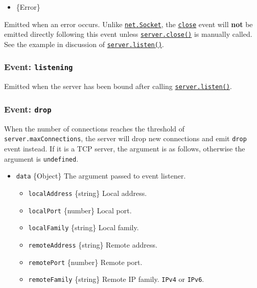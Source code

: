 \begin{itemize}
\tightlist
\item
  \{Error\}
\end{itemize}

Emitted when an error occurs. Unlike
\hyperref[class-netsocket]{\texttt{net.Socket}}, the
\hyperref[event-close]{\texttt{\textquotesingle{}close\textquotesingle{}}}
event will \textbf{not} be emitted directly following this event unless
\hyperref[serverclosecallback]{\texttt{server.close()}} is manually
called. See the example in discussion of
\hyperref[serverlisten]{\texttt{server.listen()}}.

\subsubsection{\texorpdfstring{Event:
\texttt{\textquotesingle{}listening\textquotesingle{}}}{Event: \textquotesingle listening\textquotesingle{}}}\label{event-listening}

Emitted when the server has been bound after calling
\hyperref[serverlisten]{\texttt{server.listen()}}.

\subsubsection{\texorpdfstring{Event:
\texttt{\textquotesingle{}drop\textquotesingle{}}}{Event: \textquotesingle drop\textquotesingle{}}}\label{event-drop}

When the number of connections reaches the threshold of
\texttt{server.maxConnections}, the server will drop new connections and
emit \texttt{\textquotesingle{}drop\textquotesingle{}} event instead. If
it is a TCP server, the argument is as follows, otherwise the argument
is \texttt{undefined}.

\begin{itemize}
\tightlist
\item
  \texttt{data} \{Object\} The argument passed to event listener.

  \begin{itemize}
  \tightlist
  \item
    \texttt{localAddress} \{string\} Local address.
  \item
    \texttt{localPort} \{number\} Local port.
  \item
    \texttt{localFamily} \{string\} Local family.
  \item
    \texttt{remoteAddress} \{string\} Remote address.
  \item
    \texttt{remotePort} \{number\} Remote port.
  \item
    \texttt{remoteFamily} \{string\} Remote IP family.
    \texttt{\textquotesingle{}IPv4\textquotesingle{}} or
    \texttt{\textquotesingle{}IPv6\textquotesingle{}}.
  \end{itemize}
\end{itemize}

